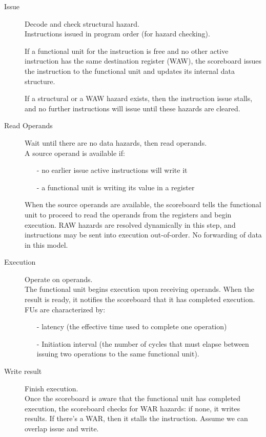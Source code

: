 \begin{description}
    \item[Issue] Decode and check structural hazard.\\
    Instructions issued in program order (for hazard checking).

    If a functional unit for the instruction is free and no other
    active instruction has the same destination register (WAW),
    the scoreboard issues the instruction to the functional unit
    and updates its internal data structure.

    If a structural or a WAW hazard exists, then the instruction
    issue stalls, and no further instructions will issue until these
    hazards are cleared.

    \item[Read Operands] Wait until there are no data hazards, then read operands.\\
    A source operand is available if:
    \begin{itemize}[noitemsep]
        \item[-] no earlier issue active instructions will write it
        \item[-] a functional unit is writing its value in a register
    \end{itemize}
    When the source operands are available, the
    scoreboard tells the functional unit to proceed to read
    the operands from the registers and begin execution.
    RAW hazards are resolved dynamically in this step,
    and instructions may be sent into execution out-of-order.
    No forwarding of data in this model.

    \item[Execution] Operate on operands.\\
    The functional unit begins execution upon receiving operands.
    When the result is ready, it notifies the scoreboard that it has completed execution.
    FUs are characterized by:
    \begin{itemize}[noitemsep]
        \item[-] latency (the effective time used to complete one
        operation)
        \item[-] Initiation interval (the number of cycles that must
        elapse between issuing two operations to the same
        functional unit).
    \end{itemize}

    \item[Write result] Finish execution.\\
    Once the scoreboard is aware that the
    functional unit has completed execution, the
    scoreboard checks for WAR hazards: if none, it writes results.
    If there's a WAR, then it stalls the instruction.
    Assume we can overlap issue and write.
\end{description}

